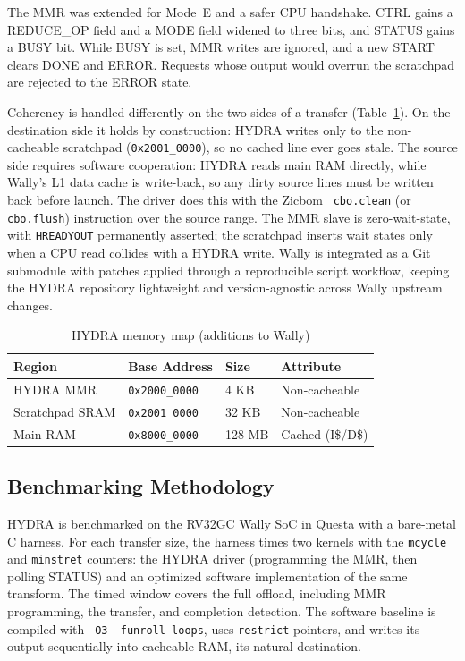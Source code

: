 \documentclass[conference]{IEEEtran}
\begin{document}
        The MMR was extended for Mode~E and a safer CPU handshake. CTRL gains
        a REDUCE\_OP field and a MODE field widened to three bits, and STATUS
        gains a BUSY bit. While BUSY is set, MMR writes are ignored, and a new
        START clears DONE and ERROR. Requests whose output would overrun the
        scratchpad are rejected to the ERROR state.

        Coherency is handled differently on the two sides of a transfer
        (Table~\ref{tab:memmap}). On the destination side it holds by
        construction: HYDRA writes only to the non-cacheable scratchpad
        (\texttt{0x2001\_0000}), so no cached line ever goes stale. The
        source side requires software cooperation: HYDRA reads main RAM
        directly, while Wally's L1 data cache is write-back, so any dirty
        source lines must be written back before launch. The driver does
        this with the Zicbom~\cite{riscv_cmo} \texttt{cbo.clean} (or
        \texttt{cbo.flush}) instruction over the source range. The MMR
        slave is zero-wait-state, with \texttt{HREADYOUT} permanently
        asserted; the scratchpad inserts wait states only when a CPU read
        collides with a HYDRA write. Wally is integrated as a Git
        submodule with patches applied through a reproducible script
        workflow, keeping the HYDRA repository lightweight and
        version-agnostic across Wally upstream changes.
        
        \begin{table}[t]
        \caption{HYDRA memory map (additions to Wally)}
        \label{tab:memmap}
        \centering
        \begin{tabular}{llll}
        \hline
        \textbf{Region} & \textbf{Base Address} & \textbf{Size} & \textbf{Attribute} \\
        \hline
            HYDRA MMR        & \texttt{0x2000\_0000} & 4 KB   & Non-cacheable \\
            Scratchpad SRAM  & \texttt{0x2001\_0000} & 32 KB  & Non-cacheable \\
            Main RAM         & \texttt{0x8000\_0000} & 128 MB & Cached (I\$/D\$) \\
        \hline
        \end{tabular}
        \end{table}
    \subsection{Benchmarking Methodology}
        HYDRA is benchmarked on the RV32GC Wally SoC in Questa with a
        bare-metal C harness. For each transfer size, the harness times
        two kernels with the \texttt{mcycle} and \texttt{minstret}
        counters: the HYDRA driver (programming the MMR, then polling
        STATUS) and an optimized software implementation of the same
        transform. The timed window covers the full offload, including
        MMR programming, the transfer, and completion detection. The
        software baseline is compiled with \texttt{-O3 -funroll-loops},
        uses \texttt{restrict} pointers, and writes its output sequentially
        into cacheable RAM, its natural destination.
\end{document}
